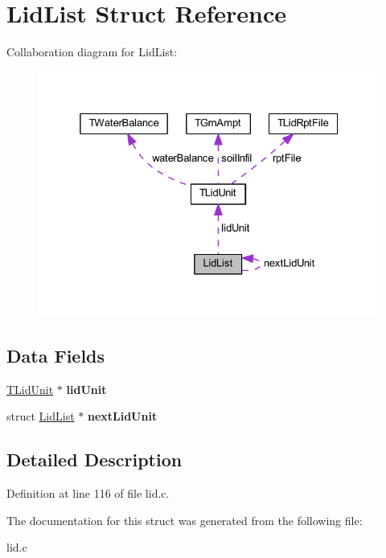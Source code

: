 \hypertarget{struct_lid_list}{}\section{Lid\+List Struct Reference}
\label{struct_lid_list}


Collaboration diagram for Lid\+List\+:
\nopagebreak
\begin{figure}[H]
\begin{center}
\leavevmode
\includegraphics[width=325pt]{d6/d6b/struct_lid_list__coll__graph}
\end{center}
\end{figure}
\subsection*{Data Fields}
\begin{DoxyCompactItemize}
\item 
\mbox{\label{struct_lid_list_a27cc0b89beb4a2940b73d419cad46978}} 
\hyperlink{struct_t_lid_unit}{T\+Lid\+Unit} $\ast$ {\bfseries lid\+Unit}
\item 
\mbox{\label{struct_lid_list_a0484d0cdbfe2fb45e2a86bb943d0bdd5}} 
struct \hyperlink{struct_lid_list}{Lid\+List} $\ast$ {\bfseries next\+Lid\+Unit}
\end{DoxyCompactItemize}


\subsection{Detailed Description}


Definition at line 116 of file lid.\+c.



The documentation for this struct was generated from the following file\+:\begin{DoxyCompactItemize}
\item 
lid.\+c\end{DoxyCompactItemize}

